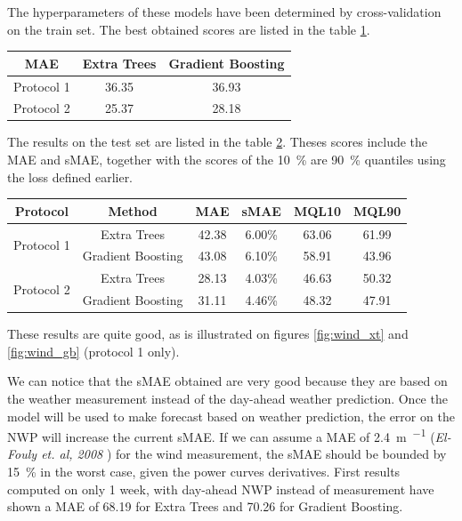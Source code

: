 \documentclass[a4paper, 12pt]{article}
\begin{document}
    The hyperparameters of these models have been determined by cross-validation on the train set. The best obtained scores are listed in the table \ref{tab:cv_train}.
    
    \begin{table}[H]
        \centering
        \begin{tabular}{|c|c|c|}
            \hline 
            MAE & Extra Trees & Gradient Boosting \\ \hline
            Protocol 1 & 36.35 & 36.93 \\ \hline
            Protocol 2 & 25.37 & 28.18 \\ \hline
        \end{tabular}
        \label{tab:cv_train}
    \end{table}
    
    The results on the test set are listed in the table \ref{tab:test_scores}. Theses scores include the MAE and sMAE, together with the scores of the \SI{10}{\percent} are \SI{90}{\percent} quantiles using the loss defined earlier. 
    
    \begin{table}[H]
        \centering
        \begin{tabular}{|c|c|c|c|c|c|}
            \hline
            Protocol & Method & MAE & sMAE & MQL10 & MQL90 \\ \hline
            \multirow{2}{*}{Protocol 1} & Extra Trees & 42.38 & 6.00\% & 63.06 & 61.99 \\ \cline{2-6}
             & Gradient Boosting & 43.08 & 6.10\% & 58.91 & 43.96 \\ \hline
            \multirow{2}{*}{Protocol 2} & Extra Trees & 28.13 & 4.03\% & 46.63 & 50.32 \\ \cline{2-6}
             & Gradient Boosting & 31.11 & 4.46\% & 48.32 & 47.91 \\ \hline
        \end{tabular}
        \label{tab:test_scores}
    \end{table}
    
    These results are quite good, as is illustrated on figures \ref{fig:wind_xt} and \ref{fig:wind_gb} (protocol 1 only). 
    
    We can notice that the sMAE obtained are very good because they are based on the weather measurement instead of the day-ahead weather prediction. Once the model will be used to make forecast based on weather prediction, the error on the NWP will increase the current sMAE. If we can assume a MAE of \SI{2.4}{\meter\per{\second}} (\emph{El-Fouly et. al, 2008} \cite{el2008one}) for the wind measurement, the sMAE should be bounded by \SI{15}{\percent} in the worst case, given the power curves derivatives. First results computed on only 1 week, with day-ahead NWP instead of measurement have shown a MAE of \num{68.19} for Extra Trees and \num{70.26} for Gradient Boosting.
    
\end{document}
